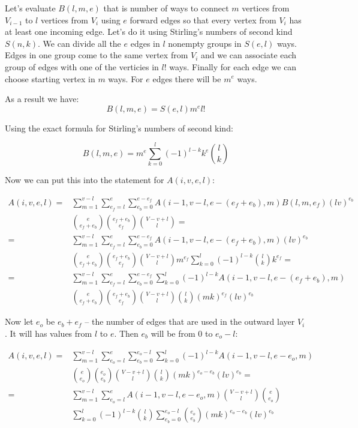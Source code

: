 \documentclass[a4paper]{article}
\begin{document}
Let's evaluate $B(l, m, e)$ that is number of ways to connect $m$ vertices from $V_{i-1}$ to $l$ vertices from $V_i$ using $e$ forward edges so that every vertex from $V_i$ has at least one incoming edge. Let's do it using Stirling's numbers of second kind $S(n, k)$. We can divide all the $e$ edges in $l$ nonempty groups in $S(e, l)$ ways. Edges in one group come to the same vertex from $V_i$ and we can associate each group of edges with one of the verticies in $l!$ ways. Finally for each edge we can choose starting vertex in $m$ ways. For $e$ edges there will be $m^e$ ways.

As a result we have:
$$B(l, m, e) = S(e, l) m^e l! $$

Using the exact formula for Stirling's numbers of second kind:

$$B(l, m, e) = m^e \sum_{k = 0}^{l} (-1)^{l-k} k^e {l \choose k}$$

Now we can put this into the statement for $A(i, v, e, l)$:

\begin{align*}
A(i, v, e, l) = & \sum_{m = 1}^{v - l}\sum_{e_f = l}^{e}\sum_{e_b = 0}^{e - e_f} A(i - 1, v - l, e - (e_f + e_b), m) B(l, m, e_f) (lv)^{e_b} \\
& {e \choose e_f + e_b} {e_f + e_b \choose e_f} {V - v + l \choose l} = \\ 
= & \sum_{m = 1}^{v - l}\sum_{e_f = l}^{e}\sum_{e_b = 0}^{e - e_f} A(i - 1, v - l, e - (e_f + e_b), m) (lv)^{e_b} \\
& {e \choose e_f + e_b} {e_f + e_b \choose e_f} {V - v + l \choose l} m^{e_f} \sum_{k = 0}^{l} (-1)^{l - k} {l \choose k} k^{e_f} = \\
= & \sum_{m = 1}^{v - l}\sum_{e_f = l}^{e}\sum_{e_b = 0}^{e - e_f}\sum_{k = 0}^{l} (-1)^{l - k} A(i - 1, v - l, e - (e_f + e_b), m) \\
&  {e \choose e_f + e_b} {e_f + e_b \choose e_f} {V - v + l \choose l} {l \choose k} (mk)^{e_f} (lv)^{e_b} 
\end{align*}

Now let $e_o$ be $e_b + e_f$ -- the number of edges that are used in the outward layer $V_i$. It will has values from $l$ to $e$. Then $e_b$ will be from $0$ to $e_o - l$:

\begin{align*}
A(i, v, e, l) = & \sum_{m = 1}^{v - l}\sum_{e_o = l}^{e}\sum_{e_b = 0}^{e_o - l}\sum_{k = 0}^{l} (-1)^{l - k} A(i - 1, v - l, e - e_o, m) \\
&  {e \choose e_o} {e_o \choose e_b} {V - v + l \choose l} {l \choose k} (mk)^{e_o - e_b} (lv)^{e_b} = \\
= & \sum_{m = 1}^{v - l}\sum_{e_o = l}^{e}  A(i - 1, v - l, e - e_o, m) {V - v + l \choose l} {e \choose e_o} \\
& \sum_{k = 0}^{l} (-1)^{l - k} {l \choose k} \sum_{e_b = 0}^{e_o - l} {e_o \choose e_b} (mk)^{e_o - e_b} (lv)^{e_b}
\end{align*}
\end{document}
